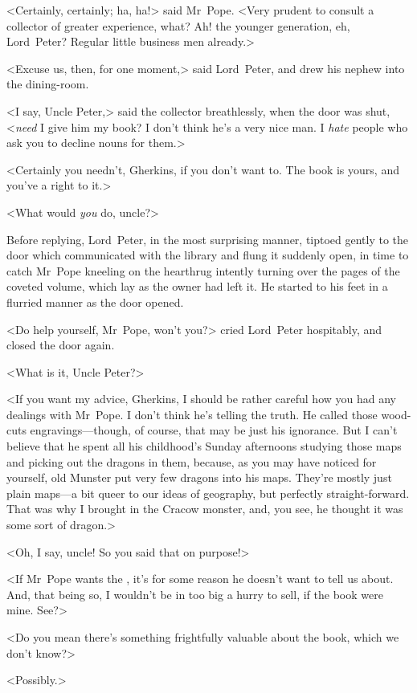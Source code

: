 <Certainly, certainly; ha, ha!> said Mr~Pope. <Very prudent to consult a collector of greater experience, what? Ah! the younger generation, eh, Lord~Peter? Regular little business men already.>

<Excuse us, then, for one moment,> said Lord~Peter, and drew his nephew into the dining-room.

<I say, Uncle Peter,> said the collector breathlessly, when the door was shut, <\emph{need} I give him my book? I don't think he's a very nice man. I \emph{hate} people who ask you to decline nouns for them.>

<Certainly you needn't, Gherkins, if you don't want to. The book is yours, and you've a right to it.>

<What would \emph{you} do, uncle?>

Before replying, Lord~Peter, in the most surprising manner, tiptoed gently to the door which communicated with the library and flung it suddenly open, in time to catch Mr~Pope kneeling on the hearthrug intently turning over the pages of the coveted volume, which lay as the owner had left it. He started to his feet in a flurried manner as the door opened.

<Do help yourself, Mr~Pope, won't you?> cried Lord~Peter hospitably, and closed the door again.

<What is it, Uncle Peter?>

<If you want my advice, Gherkins, I should be rather careful how you had any dealings with Mr~Pope. I don't think he's telling the truth. He called those wood-cuts engravings—though, of course, that may be just his ignorance. But I can't believe that he spent all his childhood's Sunday afternoons studying those maps and picking out the dragons in them, because, as you may have noticed for yourself, old Munster put very few dragons into his maps. They're mostly just plain maps—a bit queer to our ideas of geography, but perfectly straight-forward. That was why I brought in the Cracow monster, and, you see, he thought it was some sort of dragon.>

<Oh, I say, uncle! So you said that on purpose!>

<If Mr~Pope wants the , it's for some reason he doesn't want to tell us about. And, that being so, I wouldn't be in too big a hurry to sell, if the book were mine. See?>

<Do you mean there's something frightfully valuable about the book, which we don't know?>

<Possibly.>

